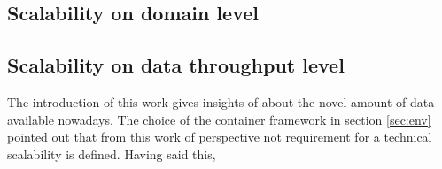 \subsection{Scalability on domain level}

\subsection{Scalability on data throughput level}

The introduction of this work gives insights of about the novel amount of data available nowadays. The choice of the container framework in section \ref{sec:env} pointed out that from this work of perspective not requirement for a technical scalability is defined. Having said this, 
















